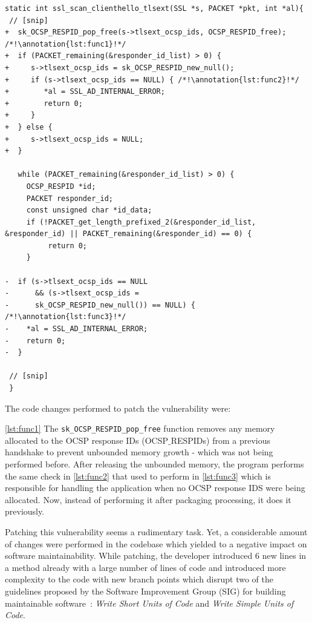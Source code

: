 \documentclass[smallextended]{svjour3}       %
\newcounter{lstannotation}
\renewcommand{\thelstannotation}{\ding{\number\numexpr181+\arabic{lstannotation}}}
\newcommand{\annotation}[1]{\refstepcounter{lstannotation}\label{#1}\thelstannotation}
\begin{document}
\medskip
\setcounter{lstannotation}{0}
\begin{lstlisting}[style={CStyle}, caption={Patch provided by OpenSSL developers to the
\\CVE-2016-6304 vulnerability on file ssl/t1\_lib.c},label={lst:vuln}]
static int ssl_scan_clienthello_tlsext(SSL *s, PACKET *pkt, int *al){ 
 // [snip]
+  sk_OCSP_RESPID_pop_free(s->tlsext_ocsp_ids, OCSP_RESPID_free); /*!\annotation{lst:func1}!*/
+  if (PACKET_remaining(&responder_id_list) > 0) { 
+     s->tlsext_ocsp_ids = sk_OCSP_RESPID_new_null();
+     if (s->tlsext_ocsp_ids == NULL) { /*!\annotation{lst:func2}!*/
+        *al = SSL_AD_INTERNAL_ERROR;
+        return 0;
+     }
+  } else {
+     s->tlsext_ocsp_ids = NULL;
+  }

   while (PACKET_remaining(&responder_id_list) > 0) {
     OCSP_RESPID *id;
     PACKET responder_id;
     const unsigned char *id_data;
     if (!PACKET_get_length_prefixed_2(&responder_id_list, &responder_id) || PACKET_remaining(&responder_id) == 0) {
          return 0;
     }

-  if (s->tlsext_ocsp_ids == NULL 
-      && (s->tlsext_ocsp_ids = 
-      sk_OCSP_RESPID_new_null()) == NULL) { /*!\annotation{lst:func3}!*/
-    *al = SSL_AD_INTERNAL_ERROR;
-    return 0;
-  }

 // [snip]
 }
\end{lstlisting}

The code changes performed to patch the vulnerability were:

\ref{lst:func1} The \texttt{sk\_OCSP\_RESPID\_pop\_free} function removes any
memory allocated to the OCSP response IDs (OCSP$\_$RESPIDs) from a previous 
handshake to prevent unbounded memory growth - which was not being performed before.
After releasing the unbounded memory, the program performs the same check 
in \ref{lst:func2} that used to perform in \ref{lst:func3} which is responsible 
for handling the application when no OCSP response IDS were being allocated. Now, 
instead of performing it after packaging processing, it does it previously.

Patching this vulnerability seems a rudimentary task. Yet,
a considerable amount of changes were performed
in the codebase which yielded to a negative impact on software maintainability.
While patching, the developer introduced $6$ new lines in a method already with 
a large number of lines of code and introduced more complexity to the code
with new branch points which disrupt two of the guidelines proposed by the Software Improvement Group 
(SIG) for building maintainable software~\cite{Visser:2016:OREILLY}: \emph{Write Short Units of Code}
and \emph{Write Simple Units of Code}. 
\end{document}
